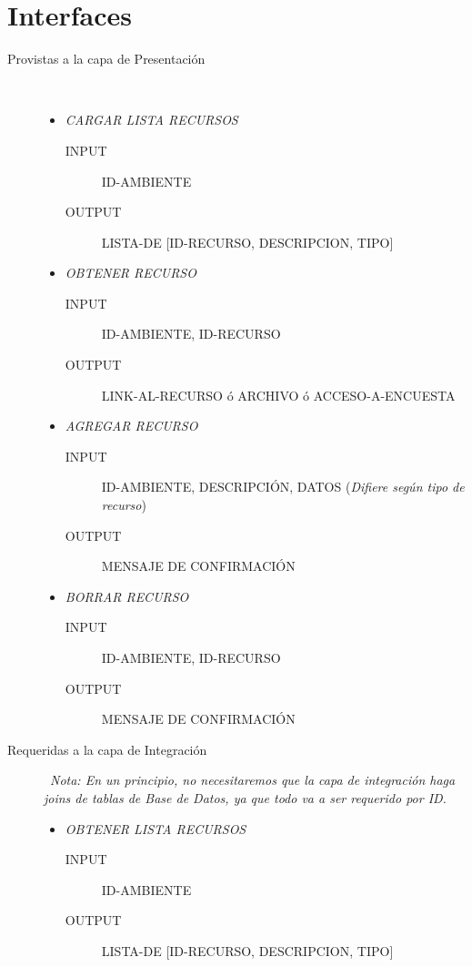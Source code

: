 \documentclass{article}
\begin{document}
\section{Interfaces}
	\begin{description}
		\item[Provistas a la capa de Presentaci\'on] \
		\renewcommand{\labelitemi}{\ding{105}} 
		\begin{itemize}
			\item \emph{CARGAR LISTA RECURSOS}
			\begin{description}
				\item[INPUT] ID-AMBIENTE
				\item[OUTPUT] LISTA-DE [ID-RECURSO, DESCRIPCION, TIPO]
			\end{description}
			\item \emph{OBTENER RECURSO}
			\begin{description}
				\item[INPUT] ID-AMBIENTE, ID-RECURSO
				\item[OUTPUT] LINK-AL-RECURSO \'o ARCHIVO \'o ACCESO-A-ENCUESTA
			\end{description}
			\item \emph{AGREGAR RECURSO}
			\begin{description}
				\item[INPUT] ID-AMBIENTE, DESCRIPCI\'ON, DATOS (\emph{Difiere seg\'un tipo de recurso})
				\item[OUTPUT] MENSAJE DE CONFIRMACI\'ON
			\end{description}
			\item \emph{BORRAR RECURSO}
			\begin{description}
				\item[INPUT] ID-AMBIENTE, ID-RECURSO
				\item[OUTPUT] MENSAJE DE CONFIRMACI\'ON
			\end{description}
		\end{itemize}
		\renewcommand{\labelitemi}{\ding{118}} 
		\item[Requeridas a la capa de Integraci\'on] \
		\emph{Nota: En un principio, no necesitaremos que la capa de integraci\'on haga joins de tablas de Base de Datos, ya que todo va a ser requerido por ID.}
		\begin{itemize}
			\item \emph{OBTENER LISTA RECURSOS}
			\begin{description}
				\item[INPUT] ID-AMBIENTE
				\item[OUTPUT] LISTA-DE [ID-RECURSO, DESCRIPCION, TIPO]

\end{description}
\end{itemize}
\end{description}
\end{document}
